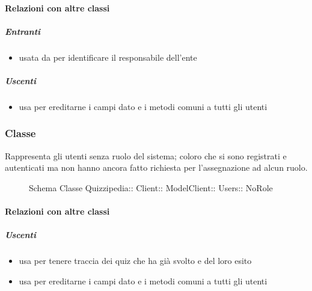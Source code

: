 \paragraph{Relazioni con altre classi}
\subparagraph{Entranti}
\begin{itemize}
\item usata da  per identificare il responsabile dell'ente
\end{itemize}
\subparagraph{Uscenti}
\begin{itemize}
\item usa  per ereditarne i campi dato e i metodi comuni a tutti gli utenti
\end{itemize}
\subsubsection{Classe }
Rappresenta gli utenti senza ruolo del sistema; coloro che si sono registrati e autenticati ma non hanno ancora fatto richiesta per l'assegnazione ad alcun ruolo.
\begin{figure}[H]
\centering
\noindent{}
\caption[Schema Classe NoRole]{Schema Classe Quizzipedia:: Client:: ModelClient:: Users:: NoRole}
\end{figure}
\paragraph{Relazioni con altre classi}
\subparagraph{Uscenti}
\begin{itemize}
\item usa  per tenere traccia dei quiz che ha già svolto e del loro esito
\item usa  per ereditarne i campi dato e i metodi comuni a tutti gli utenti
\end{itemize}
